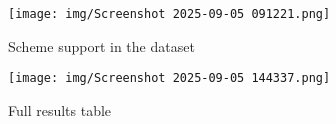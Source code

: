 \documentclass[11pt]{article}
\begin{document}

\appendix
\begin{figure*}
    \centering
    \texttt{[image: img/Screenshot 2025-09-05 091221.png]}
    \caption{Scheme support in the dataset}
    \label{fig:scheme-support}
\end{figure*}

\begin{figure*}
    \centering
    \texttt{[image: img/Screenshot 2025-09-05 144337.png]}
    \caption{Full results table}
    \label{fig:results}
\end{figure*}

\end{document}
